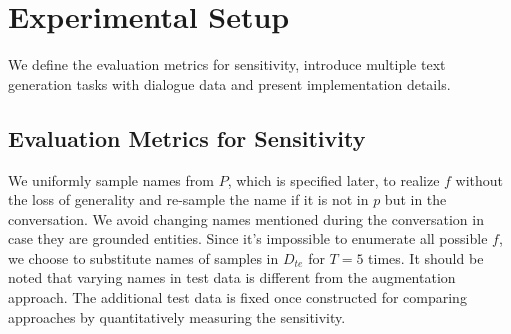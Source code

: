 

\section{Experimental Setup}
We define the evaluation metrics for sensitivity, introduce multiple text generation tasks with dialogue data and present implementation details.%




\subsection{Evaluation Metrics for Sensitivity}
\label{sec:quatification}

We uniformly sample names from $P$, which is specified later, to realize $f$ without the loss of generality and re-sample the name if it is not in $p$ but in the conversation. We avoid changing names mentioned during the conversation in case they are grounded entities. Since it's impossible to enumerate all possible $f$, we choose to substitute names of samples in $D_{te}$ for $T=5$ times. It should be noted that varying names in test data is different from the augmentation approach. The additional test data is fixed once constructed for comparing approaches by quantitatively measuring the sensitivity.





